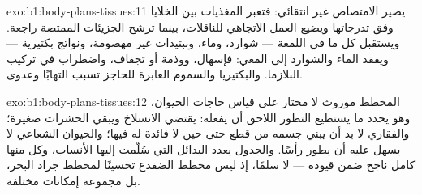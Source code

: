 \begin{solution}{exo:b1:body-plans-tissues:11}
يصير الامتصاص غير انتقائي: فتعبر المغذيات بين الخلايا وفق تدرجاتها
ويضيع العمل الاتجاهي للناقلات، بينما ترشح الجزيئات الممتصة راجعة.
ويستقبل  كل ما في اللمعة --- شوارد، وماء، وببتيدات غير
مهضومة، ونواتج بكتيرية --- ويفقد الماء والشوارد إلى المعي: فإسهال،
ووذمة أو تجفاف، واضطراب في تركيب البلازما. والبكتيريا والسموم
العابرة للحاجز تسبب التهابًا وعدوى.
\end{solution}

\begin{solution}{exo:b1:body-plans-tissues:12}
المخطط موروث لا مختار على قياس حاجات الحيوان، وهو يحدد ما يستطيع
التطور اللاحق أن يفعله:  يقتضي الانسلاخ ويبقي الحشرات
صغيرة؛ والفقاري لا بد أن يبني جسمه من قطع حتى حين لا فائدة له فيها؛
والحيوان الشعاعي لا يسهل عليه أن يطور رأسًا. والجدول يعدد البدائل
التي سُلّمت إليها الأنساب، وكل منها كامل ناجح ضمن قيوده --- لا سلمًا،
إذ ليس مخطط الضفدع تحسينًا لمخطط جراد البحر، بل مجموعة إمكانات
مختلفة.
\end{solution}

